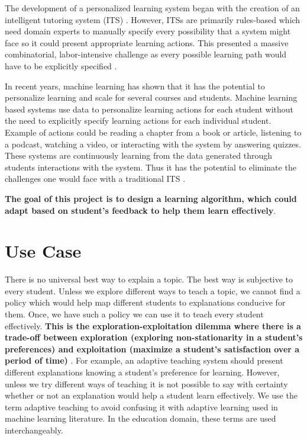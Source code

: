 \label{chapter:introduction}

The development of a personalized learning system began with the creation of an intelligent tutoring system (ITS) \cite{brusilovsky2003adaptive,koedinger1997intelligent,vanlehn2005andes,woolf2010building}. However, ITSs are primarily rules-based which need domain experts to manually specify every possibility that a system might face so it could present appropriate learning actions. This presented a massive combinatorial, labor-intensive challenge as every possible learning path would have to be explicitly specified \cite{lan2016contextual}.\par 

In recent years, machine learning has shown that it has the potential to personalize learning and scale for several courses and students. Machine learning based systems use data to personalize learning actions for each student without the need to explicitly specify learning actions for each individual student. Example of actions could be reading a chapter from a book or article, listening to a podcast, watching a video, or interacting with the system by answering quizzes. These systems are continuously learning from the data generated through students interactions with the system. Thus it has the potential to eliminate the challenges one would face with a traditional ITS  \cite{lan2016contextual}. \par 

\textbf{The goal of this project is to design a learning algorithm, which could adapt based on student's feedback to help them learn effectively}. \par 

\section{Use Case \label{chap1:useCase}}

There is no universal best way to explain a topic. The best way is subjective to every student. Unless we explore different ways to teach a topic, we cannot find a policy which would help map different students to explanations conducive for them. Once, we have such a policy we can use it to teach every student effectively. \textbf{This is the exploration-exploitation dilemma where there is a trade-off between exploration (exploring non-stationarity in a student's preferences) and exploitation (maximize a student's satisfaction over a period of time)} \cite{agarwal2009online}. For example, an adaptive teaching system should present different explanations knowing a student's preference for learning. However, unless we try different ways of teaching it is not possible to say with certainty whether or not an explanation would help a student learn effectively. We use the term adaptive teaching to avoid confusing it with adaptive learning used in machine learning literature. In the education domain, these terms are used interchangeably. \par 

